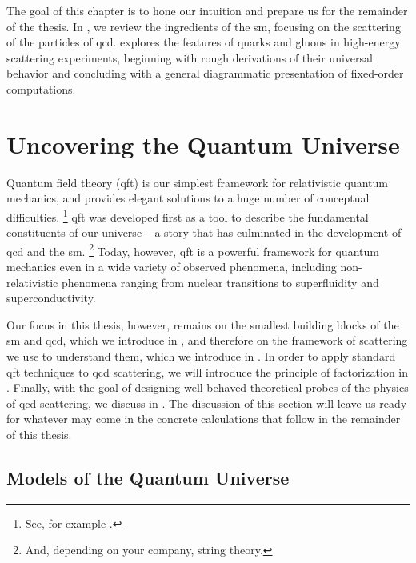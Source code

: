 The goal of this chapter is to hone our intuition and prepare us for the remainder of the thesis.
%
In , we review the ingredients of the \gls{sm}, focusing on the scattering of the particles of \gls{qcd}.
%
 explores the features of quarks and gluons in high-energy scattering experiments, beginning with rough derivations of their universal behavior and concluding with a general diagrammatic presentation of fixed-order computations.



\section{Uncovering the Quantum Universe}
\label{sec:sm-scattering-review}

Quantum field theory (\gls{qft}) is our simplest framework for relativistic quantum mechanics, and provides elegant solutions to a huge number of conceptual difficulties.%
\footnote{
    See, for example  .
}
%
\Gls{qft} was developed first as a tool to describe the fundamental constituents of our universe -- a story that has culminated in the development of \gls{qcd} and the \gls{sm}.%
\footnote{
    And, depending on your company, string theory.
}
%
Today, however, \gls{qft} is a powerful framework for quantum mechanics even in a wide variety of observed phenomena, including non-relativistic phenomena ranging from nuclear transitions to superfluidity and superconductivity.

Our focus in this thesis, however, remains on the smallest building blocks of the \gls{sm} and \gls{qcd}, which we introduce in , and therefore on the framework of \gls{scattering} we use to understand them, which we introduce in .
%
In order to apply standard \gls{qft} techniques to \gls{qcd} scattering, we will introduce the principle of factorization in .
%
Finally, with the goal of designing well-behaved theoretical probes of the physics of \gls{qcd} \gls{scattering}, we discuss  in .
%
The discussion of this section will leave us ready for whatever may come in the concrete calculations that follow in the remainder of this thesis.


\subsection{Models of the Quantum Universe}
\label{sec:sm-qcd}

